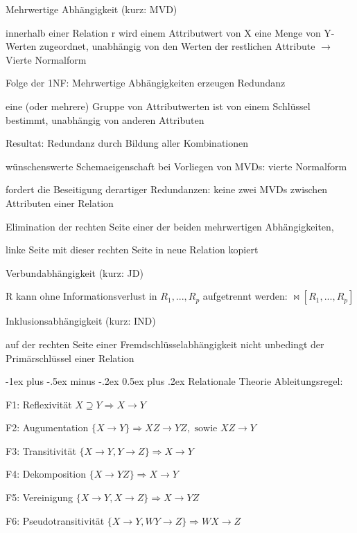 \documentclass[a4paper]{article}
\makeatletter
\renewcommand{\section}{\@startsection{section}{1}{0mm}%
                                {-1ex plus -.5ex minus -.2ex}%
                                {0.5ex plus .2ex}%
                                {\normalfont\large\bfseries}}
\makeatother
\begin{document}
\begin{multicols}{3}
\begin{itemize*}
\begin{itemize*}
        \end{itemize*}
        \item Mehrwertige Abhängigkeit (kurz: MVD)
        \begin{itemize*}
            \item innerhalb einer Relation r wird einem Attributwert von X eine Menge von Y-Werten zugeordnet, unabhängig von den Werten der restlichen Attribute $\rightarrow$ Vierte Normalform
            \item Folge der 1NF: Mehrwertige Abhängigkeiten erzeugen Redundanz
            \item eine (oder mehrere) Gruppe von Attributwerten ist von einem Schlüssel bestimmt, unabhängig von anderen Attributen
            \item Resultat: Redundanz durch Bildung aller Kombinationen
            \item wünschenswerte Schemaeigenschaft bei Vorliegen von MVDs: vierte Normalform
            \item fordert die Beseitigung derartiger Redundanzen: keine zwei MVDs zwischen Attributen einer Relation
            \item Elimination der rechten Seite einer der beiden mehrwertigen Abhängigkeiten,
            \item linke Seite mit dieser rechten Seite in neue Relation kopiert
            \item Verbundabhängigkeit (kurz: JD)
            \item R kann ohne Informationsverlust in $R_1,..., R_p$ aufgetrennt werden: $\bowtie [R_1,..., R_p]$
            \item Inklusionsabhängigkeit (kurz: IND)
            \item auf der rechten Seite einer Fremdschlüsselabhängigkeit nicht unbedingt der Primärschlüssel einer Relation
        \end{itemize*}
    \end{itemize*}


    \section{Relationale Theorie}
    Ableitungsregel:
    \begin{itemize*}
        \item F1: Reflexivität $X\supseteq Y \Rightarrow X\rightarrow Y$
        \item F2: Augumentation $\{X\rightarrow Y\}\Rightarrow XZ\rightarrow YZ, \text{ sowie } XZ\rightarrow Y$
        \item F3: Transitivität $\{ X\rightarrow Y,Y\rightarrow Z\}\Rightarrow X\rightarrow Y$
        \item F4: Dekomposition $\{X\rightarrow YZ\} \Rightarrow X\rightarrow Y$
        \item F5: Vereinigung $\{X\rightarrow Y, X\rightarrow Z\}\Rightarrow X\rightarrow YZ$
        \item F6: Pseudotransitivität $\{X\rightarrow Y, WY\rightarrow Z\}\Rightarrow WX\rightarrow Z$
    \end{itemize*}


\end{multicols}
\end{document}
